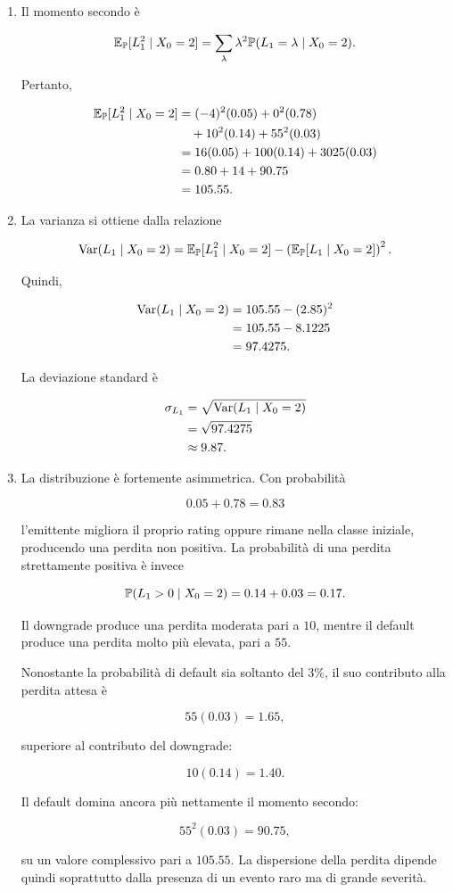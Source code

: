 \begin{enumerate}
\item Il momento secondo \`{e}

\[
\mathbb{E}_{\mathbb{P}}[L_1^2\mid X_0=2]
=
\sum_{\lambda}
\lambda^2
\mathbb{P}(L_1=\lambda\mid X_0=2).
\]

Pertanto,

\[
\begin{split}
\mathbb{E}_{\mathbb{P}}[L_1^2\mid X_0=2]
&=
(-4)^2(0.05)
+
0^2(0.78)
\\
&\quad
+
10^2(0.14)
+
55^2(0.03)
\\
&=
16(0.05)
+
100(0.14)
+
3025(0.03)
\\
&=
0.80+14+90.75
\\
&=
105.55.
\end{split}
\]

\item La varianza si ottiene dalla relazione

\[
\operatorname{Var}(L_1\mid X_0=2)
=
\mathbb{E}_{\mathbb{P}}[L_1^2\mid X_0=2]
-
\left(
\mathbb{E}_{\mathbb{P}}[L_1\mid X_0=2]
\right)^2.
\]

Quindi,

\[
\begin{split}
\operatorname{Var}(L_1\mid X_0=2)
&=
105.55-(2.85)^2
\\
&=
105.55-8.1225
\\
&=
97.4275.
\end{split}
\]

La deviazione standard \`{e}

\[
\begin{split}
\sigma_{L_1}
&=
\sqrt{\operatorname{Var}(L_1\mid X_0=2)}
\\
&=
\sqrt{97.4275}
\\
&\approx
9.87.
\end{split}
\]

\item La distribuzione \`{e} fortemente asimmetrica. Con probabilit\`{a}

\[
0.05+0.78=0.83
\]

l'emittente migliora il proprio rating oppure rimane nella classe
iniziale, producendo una perdita non positiva. La probabilit\`{a} di
una perdita strettamente positiva \`{e} invece

\[
\mathbb{P}(L_1>0\mid X_0=2)
=
0.14+0.03
=
0.17.
\]

Il downgrade produce una perdita moderata pari a $10$, mentre il
default produce una perdita molto pi\`{u} elevata, pari a $55$.

Nonostante la probabilit\`{a} di default sia soltanto del $3\%$, il suo
contributo alla perdita attesa \`{e}

\[
55(0.03)=1.65,
\]

superiore al contributo del downgrade:

\[
10(0.14)=1.40.
\]

Il default domina ancora pi\`{u} nettamente il momento secondo:

\[
55^2(0.03)=90.75,
\]

su un valore complessivo pari a $105.55$. La dispersione della perdita
dipende quindi soprattutto dalla presenza di un evento raro ma di
grande severit\`{a}.

\end{enumerate}

